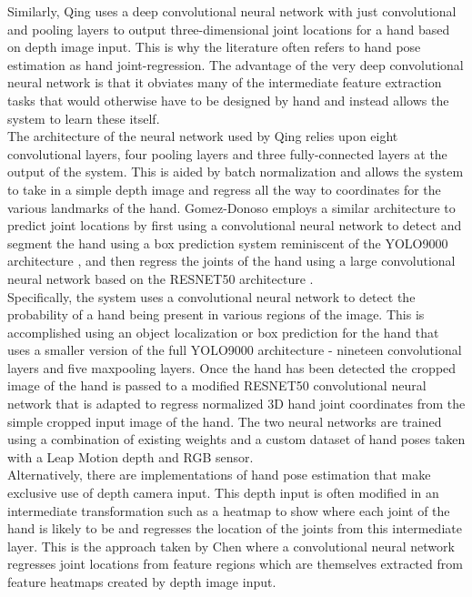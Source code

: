 Similarly, Qing \cite{deep_cnn} uses a deep convolutional neural network with just convolutional and pooling layers to output three-dimensional joint locations for a hand based on depth image input. This is why the literature often refers to hand pose estimation as hand joint-regression. The advantage of the very deep convolutional neural network is that it obviates many of the intermediate feature extraction tasks that would otherwise have to be designed by hand and instead allows the system to learn these itself. \\

The architecture of the neural network used by Qing relies upon eight convolutional layers, four pooling layers and three fully-connected layers at the output of the system. This is aided by batch normalization and allows the system to take in a simple depth image and regress all the way to coordinates for the various landmarks of the hand. Gomez-Donoso \cite{hand_pose_rgb_camera} employs a similar architecture to predict joint locations by first using a convolutional neural network to detect and segment the hand using a box prediction system reminiscent of the YOLO9000 architecture \cite{yolo_9000}, and then regress the joints of the hand using a large convolutional neural network based on the RESNET50 architecture \cite{resnet_50}.\\

Specifically, the system uses a convolutional neural network to detect the probability of a hand being present in various regions of the image. This is accomplished using an object localization or box prediction for the hand that uses a smaller version of the full YOLO9000 architecture - nineteen convolutional layers and five maxpooling layers. Once the hand has been detected the cropped image of the hand is passed to a modified RESNET50 convolutional neural network that is adapted to regress normalized 3D hand joint coordinates from the simple cropped input image of the hand. The two neural networks are trained using a combination of existing weights and a custom dataset of hand poses taken with a Leap Motion depth and RGB sensor. \\

Alternatively, there are implementations of hand pose estimation that make exclusive use of depth camera input. This depth input is often modified in an intermediate transformation such as a heatmap to show where each joint of the hand is likely to be and regresses the location of the joints from this intermediate layer. This is the approach taken by Chen \cite{pose_guided_cnn} where a convolutional neural network regresses joint locations from feature regions which are themselves extracted from feature heatmaps created by depth image input. \\

